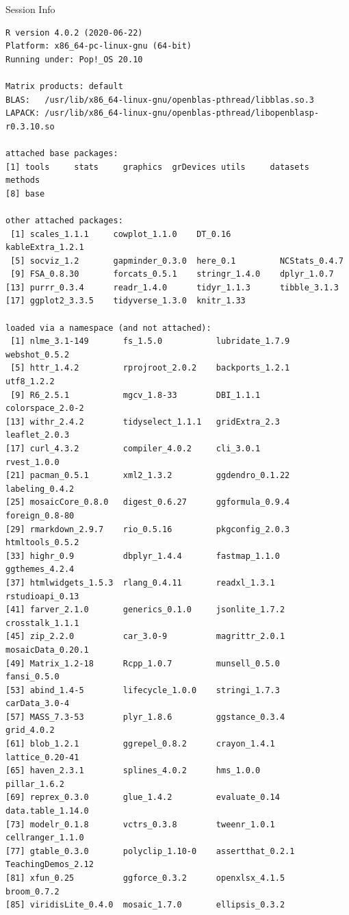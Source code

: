 \documentclass[10pt]{beamer}\usepackage[]{graphicx}\usepackage[]{color}
\makeatletter
\newenvironment{kframe}{%
 \def\at@end@of@kframe{}%
 \ifinner\ifhmode%
  \def\at@end@of@kframe{\end{minipage}}%
  \begin{minipage}{\columnwidth}%
 \fi\fi%
 \def\FrameCommand##1{\hskip\@totalleftmargin \hskip-\fboxsep
 \colorbox{shadecolor}{##1}\hskip-\fboxsep
     \hskip-\linewidth \hskip-\@totalleftmargin \hskip\columnwidth}%
 \MakeFramed {\advance\hsize-\width
   \@totalleftmargin\z@ \linewidth\hsize
   \@setminipage}}%
 {\par\unskip\endMakeFramed%
 \at@end@of@kframe}
\newenvironment{knitrout}{}{} %
\makeatother
\begin{document}
	\begin{frame}[fragile]{Session Info}
	\tiny
	
\begin{knitrout}\tiny
{}\color{fgcolor}\begin{kframe}
\begin{verbatim}
R version 4.0.2 (2020-06-22)
Platform: x86_64-pc-linux-gnu (64-bit)
Running under: Pop!_OS 20.10

Matrix products: default
BLAS:   /usr/lib/x86_64-linux-gnu/openblas-pthread/libblas.so.3
LAPACK: /usr/lib/x86_64-linux-gnu/openblas-pthread/libopenblasp-r0.3.10.so

attached base packages:
[1] tools     stats     graphics  grDevices utils     datasets  methods  
[8] base     

other attached packages:
 [1] scales_1.1.1     cowplot_1.1.0    DT_0.16          kableExtra_1.2.1
 [5] socviz_1.2       gapminder_0.3.0  here_0.1         NCStats_0.4.7   
 [9] FSA_0.8.30       forcats_0.5.1    stringr_1.4.0    dplyr_1.0.7     
[13] purrr_0.3.4      readr_1.4.0      tidyr_1.1.3      tibble_3.1.3    
[17] ggplot2_3.3.5    tidyverse_1.3.0  knitr_1.33      

loaded via a namespace (and not attached):
 [1] nlme_3.1-149       fs_1.5.0           lubridate_1.7.9    webshot_0.5.2     
 [5] httr_1.4.2         rprojroot_2.0.2    backports_1.2.1    utf8_1.2.2        
 [9] R6_2.5.1           mgcv_1.8-33        DBI_1.1.1          colorspace_2.0-2  
[13] withr_2.4.2        tidyselect_1.1.1   gridExtra_2.3      leaflet_2.0.3     
[17] curl_4.3.2         compiler_4.0.2     cli_3.0.1          rvest_1.0.0       
[21] pacman_0.5.1       xml2_1.3.2         ggdendro_0.1.22    labeling_0.4.2    
[25] mosaicCore_0.8.0   digest_0.6.27      ggformula_0.9.4    foreign_0.8-80    
[29] rmarkdown_2.9.7    rio_0.5.16         pkgconfig_2.0.3    htmltools_0.5.2   
[33] highr_0.9          dbplyr_1.4.4       fastmap_1.1.0      ggthemes_4.2.4    
[37] htmlwidgets_1.5.3  rlang_0.4.11       readxl_1.3.1       rstudioapi_0.13   
[41] farver_2.1.0       generics_0.1.0     jsonlite_1.7.2     crosstalk_1.1.1   
[45] zip_2.2.0          car_3.0-9          magrittr_2.0.1     mosaicData_0.20.1 
[49] Matrix_1.2-18      Rcpp_1.0.7         munsell_0.5.0      fansi_0.5.0       
[53] abind_1.4-5        lifecycle_1.0.0    stringi_1.7.3      carData_3.0-4     
[57] MASS_7.3-53        plyr_1.8.6         ggstance_0.3.4     grid_4.0.2        
[61] blob_1.2.1         ggrepel_0.8.2      crayon_1.4.1       lattice_0.20-41   
[65] haven_2.3.1        splines_4.0.2      hms_1.0.0          pillar_1.6.2      
[69] reprex_0.3.0       glue_1.4.2         evaluate_0.14      data.table_1.14.0 
[73] modelr_0.1.8       vctrs_0.3.8        tweenr_1.0.1       cellranger_1.1.0  
[77] gtable_0.3.0       polyclip_1.10-0    assertthat_0.2.1   TeachingDemos_2.12
[81] xfun_0.25          ggforce_0.3.2      openxlsx_4.1.5     broom_0.7.2       
[85] viridisLite_0.4.0  mosaic_1.7.0       ellipsis_0.3.2    
\end{verbatim}
\end{kframe}
\end{knitrout}
	
\end{frame}
\end{document}
